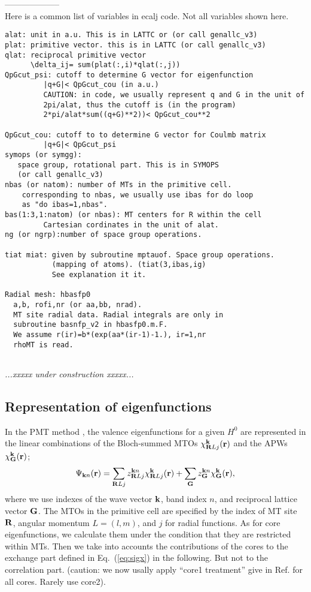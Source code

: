 \documentclass[a4paper,10pt,epsf,fleqn]{article}
\def\Psikn{\Psi_{{\bf k}n}}
\def\Psikn{{\Psi_{{\bf k}n}}}
\def\brl{{\bf R}L}
\def\H0{H^0}
\def\underconstruction{{\it...xxxxx under construction xxxxx...\\}}
\newcommand{\bfk}{{\bf k}}
\newcommand{\bfr}{{\bf r}}
\newcommand{\bfG}{{\bf G}}
\newcommand{\bfR}{{\bf R}}
\newcommand{\req}[1]{\mbox{Eq.~(\ref{#1})}}
\begin{document}
\noindent --------------------\\
Here is a common list of variables in ecalj code.
Not all variables shown here.
\begin{verbatim}
alat: unit in a.u. This is in LATTC or (or call genallc_v3)
plat: primitive vector. this is in LATTC (or call genallc_v3)
qlat: reciprocal primitive vector  
      \delta_ij= sum(plat(:,i)*qlat(:,j))
QpGcut_psi: cutoff to determine G vector for eigenfunction
         |q+G|< QpGcut_cou (in a.u.)
         CAUTION: in code, we usually represent q and G in the unit of
         2pi/alat, thus the cutoff is (in the program)
         2*pi/alat*sum((q+G)**2))< QpGcut_cou**2
         
QpGcut_cou: cutoff to to determine G vector for Coulmb matrix
         |q+G|< QpGcut_psi
symops (or symgg): 
   space group, rotational part. This is in SYMOPS 
   (or call genallc_v3)
nbas (or natom): number of MTs in the primitive cell.
    corresponding to nbas, we usually use ibas for do loop
    as "do ibas=1,nbas".
bas(1:3,1:natom) (or nbas): MT centers for R within the cell
         Cartesian cordinates in the unit of alat.
ng (or ngrp):number of space group operations. 

tiat miat: given by subroutine mptauof. Space group operations.
           (mapping of atoms). (tiat(3,ibas,ig)
           See explanation it it.

Radial mesh: hbasfp0
  a,b, rofi,nr (or aa,bb, nrad).
  MT site radial data. Radial integrals are only in 
  subroutine basnfp_v2 in hbasfp0.m.F.
  We assume r(ir)=b*(exp(aa*(ir-1)-1.), ir=1,nr
  rhoMT is read.
  
\end{verbatim}

\underconstruction

\subsection{Representation of eigenfunctions}
In the PMT method \cite{kotani_fusion_2010}, 
the valence eigenfunctions for a given $\H0$ are represented
in the linear combinations of the Bloch-summed MTOs
$\chi^{\bfk}_{\brl{j}}({\bf r})$ and the APWs $\chi^{\bfk}_\bfG (\bfr)$;
\begin{eqnarray}
\label{eq:lmtopsi}
\Psikn(\bfr) = \sum_{\brl{j}} z^{{\bfk}n}_{\brl{j}}
\chi^{\bfk}_{\brl{j}}({\bfr})+ \sum_{\bfG} z^{\bfk n}_{\bfG}
\chi^{\bfk}_\bfG(\bfr),
\label{eqeigen}
\end{eqnarray}
where we use indexes of the wave vector $\bfk$, band index $n$, and 
reciprocal lattice vector $\bfG$. The MTOs in the primitive cell are 
specified by the index of MT site $\bfR$, 
angular momentum $L=(l,m)$, and $j$ for radial functions. 
As for core eigenfunctions, we calculate them under the condition
that they are restricted within MTs.
Then we take into accounts the contributions of the cores to the exchange part defined in \req{eq:sigx} in the following. But not to the correlation part. 
{\small (caution: we now usally apply ``core1 treatment'' give in 
Ref.\cite{kotani07a} for all cores. Rarely use core2).}
\end{document}
